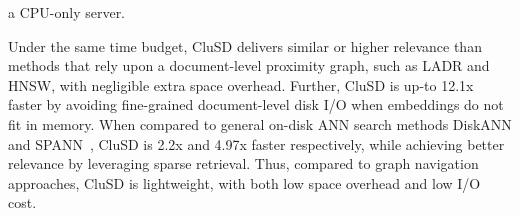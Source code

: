 a CPU-only server. 


Under the same time budget, CluSD delivers similar or higher relevance than methods that rely upon
a document-level proximity graph, such as LADR and HNSW, with negligible extra space overhead.
Further, CluSD is up-to 12.1x faster by avoiding fine-grained document-level disk I/O when embeddings do not fit in memory.
When compared to general on-disk ANN search methods DiskANN and SPANN~\cite{NEURIPS2019_DiskANN,2023Web-Filtered-DiskANN},
CluSD is 2.2x and 4.97x faster respectively, while achieving better relevance
by leveraging sparse retrieval.
Thus, compared to graph navigation approaches, CluSD is lightweight, with both low space overhead and low I/O cost.


